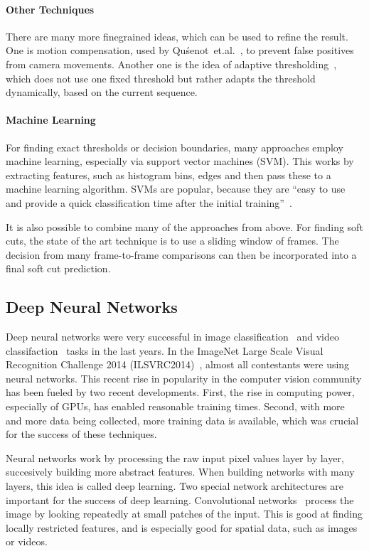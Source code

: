 \paragraph{Other Techniques}
There are many more finegrained ideas, which can be used to refine the result.
One is motion compensation, used by Qu{\'s}enot~et.al.~\cite{qousenot2003clips}, to prevent false positives from camera movements.
Another one is the idea of adaptive thresholding~\cite{volkmer2004rmit}, which does not use one fixed threshold but rather adapts the threshold dynamically, based on the current sequence.

\paragraph{Machine Learning}
For finding exact thresholds or decision boundaries, many approaches employ machine learning, especially via support vector machines (SVM).
This works by extracting features, such as histogram bins, edges and then pass these to a machine learning algorithm.
SVMs are popular, because they are ``easy to use and provide a quick classification time after the initial training''~\cite{smeaton2010video}.


It is also possible to combine many of the approaches from above.
For finding soft cuts, the state of the art technique is to use a sliding window of frames.
The decision from many frame-to-frame comparisons can then be incorporated into a final soft cut prediction.

\subsection{Deep Neural Networks}
Deep neural networks were very successful in image classification~\cite{krizhevsky2012imagenet} and video classifaction~\cite{karpathy2014large} tasks in the last years.
In the ImageNet Large Scale Visual Recognition Challenge 2014 (ILSVRC2014)~\cite{imagenet}, almost all contestants were using neural networks.
This recent rise in popularity in the computer vision community has been fueled by two recent developments.
First, the rise in computing power, especially of GPUs, has enabled reasonable training times.
Second, with more and more data being collected, more training data is available, which was crucial for the success of these techniques.

Neural networks work by processing the raw input pixel values layer by layer, succesively building more abstract features.
When building networks with many layers, this idea is called deep learning.
Two special network architectures are important for the success of deep learning.
Convolutional networks~\cite{lecun1998gradient} process the image by looking repeatedly at small patches of the input.
This is good at finding locally restricted features, and is especially good for spatial data, such as images or videos.

